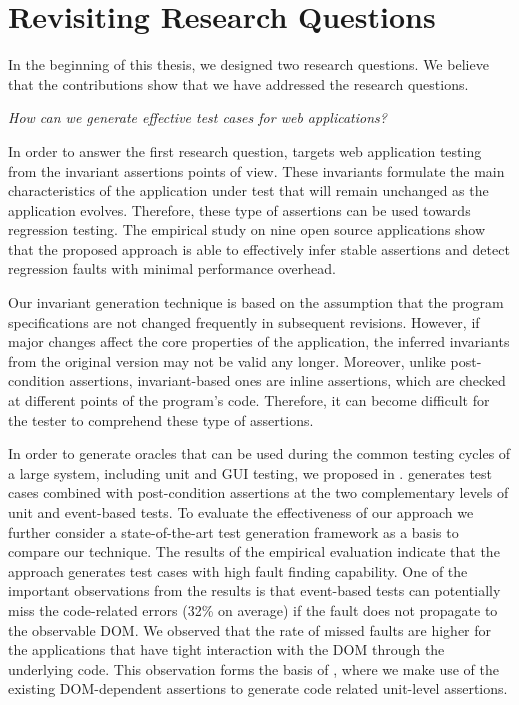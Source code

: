 \section{Revisiting Research Questions} 
In the beginning of this thesis, we designed two research questions. We believe that the contributions show that we have addressed the research questions.

\emph{How can we generate effective test cases for \javascript web applications?}

In order to answer the first research question,  targets web application testing from the invariant assertions points of view. These invariants formulate the main characteristics of the application under test that will remain unchanged as the application evolves. Therefore, these type of assertions can be used towards regression testing. The empirical study on nine open source \javascript applications show that the proposed approach is able to effectively infer stable assertions and 
detect regression faults with minimal performance overhead.

Our invariant generation technique is based on the assumption that the program specifications are not changed frequently in subsequent revisions. However, if major changes affect the core properties of the application, the inferred invariants from the original version may not be valid any longer. Moreover, unlike post-condition assertions, invariant-based ones are inline assertions, which are checked at different points of the program's code. Therefore, it can become difficult for the tester to comprehend these type of assertions.

In order to generate oracles that can be used during the common testing cycles of a large system, including unit and GUI testing, we proposed \jseft in . \jseft generates test cases combined with post-condition assertions at the two complementary levels of unit and event-based tests. To evaluate the effectiveness of our approach we further consider a state-of-the-art \javascript test generation framework as a basis to compare our technique. The results of the empirical evaluation indicate that the approach generates test cases with high fault finding capability. One of the important observations from the results is that event-based tests can potentially miss the code-related errors (32\% on average) if the fault does not propagate to the observable DOM. We observed that the rate of missed faults are higher for the applications that have tight interaction with the DOM through the underlying \javascript code. This observation forms the basis of , where we make use of the existing DOM-dependent assertions to generate code related unit-level assertions.

